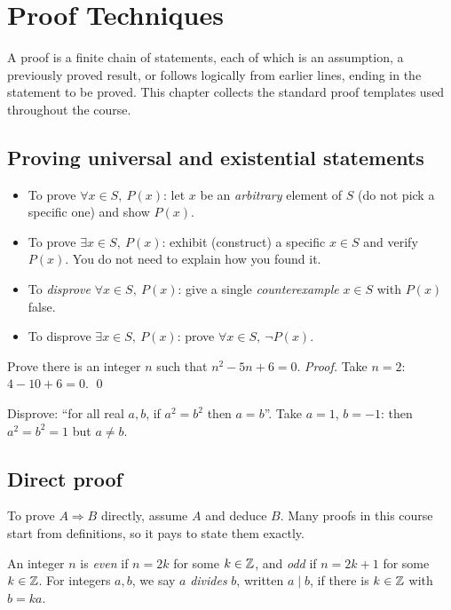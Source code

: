 \chapter{Proof Techniques}

A proof is a finite chain of statements, each of which is an assumption, a previously proved
result, or follows logically from earlier lines, ending in the statement to be proved. This
chapter collects the standard proof templates used throughout the course.

\section{Proving universal and existential statements}

\begin{itemize}
  \item To prove $\forall x \in S,\ P(x)$: let $x$ be an \emph{arbitrary} element of $S$ (do not
        pick a specific one) and show $P(x)$.
  \item To prove $\exists x \in S,\ P(x)$: exhibit (construct) a specific $x \in S$ and verify
        $P(x)$. You do not need to explain how you found it.
  \item To \emph{disprove} $\forall x \in S,\ P(x)$: give a single \emph{counterexample}
        $x \in S$ with $P(x)$ false.
  \item To disprove $\exists x \in S,\ P(x)$: prove $\forall x \in S,\ \neg P(x)$.
\end{itemize}

\begin{example}
Prove there is an integer $n$ such that $n^2 - 5n + 6 = 0$.
\emph{Proof.} Take $n = 2$: $4 - 10 + 6 = 0$. \qed
\end{example}

\begin{example}[Counterexample]
Disprove: ``for all real $a,b$, if $a^2 = b^2$ then $a = b$''. Take $a = 1$, $b = -1$: then
$a^2 = b^2 = 1$ but $a \neq b$.
\end{example}

\section{Direct proof}

To prove $A \Rightarrow B$ directly, assume $A$ and deduce $B$. Many proofs in this course
start from definitions, so it pays to state them exactly.

\begin{definition}
An integer $n$ is \emph{even} if $n = 2k$ for some $k \in \mathbb{Z}$, and \emph{odd} if $n = 2k+1$ for
some $k\in\mathbb{Z}$. For integers $a,b$, we say $a$ \emph{divides} $b$, written $a \mid b$, if there
is $k \in \mathbb{Z}$ with $b = ka$.
\end{definition}

